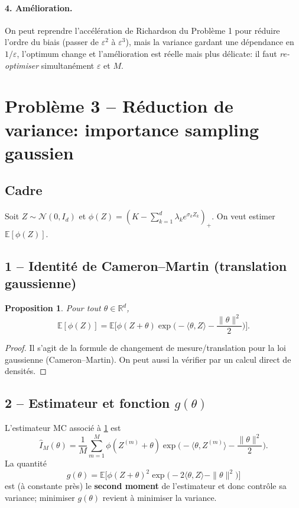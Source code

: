 \documentclass[11pt,a4paper]{article}
\newcommand{\E}{\mathbb{E}}
\newcommand{\R}{\mathbb{R}}
\newcommand{\1}{\mathbbm{1}}
\theoremstyle{plain}
\newtheorem{proposition}{Proposition}
\theoremstyle{definition}
\begin{document}
\paragraph{4. Amélioration.}
On peut reprendre l'accélération de Richardson du Problème 1 pour réduire l'ordre du biais (passer de $\varepsilon^2$ à $\varepsilon^3$), mais la variance gardant une dépendance en $1/\varepsilon$, l'optimum change et l'amélioration est réelle mais plus délicate: il faut \emph{re-optimiser} simultanément $\varepsilon$ et $M$.

\section{Problème 3 -- Réduction de variance: importance sampling gaussien}
\subsection{Cadre}
Soit $Z\sim\mathcal N(0,I_d)$ et $\phi(Z)=(K-\sum_{k=1}^d \lambda_k e^{\sigma_k Z_k})_+$.
On veut estimer $\E[\phi(Z)]$.

\subsection{1 -- Identité de Cameron--Martin (translation gaussienne)}
\begin{proposition}\label{prop:cameron-martin}
Pour tout $\theta\in\R^d$,
\[
\E[\phi(Z)]=\E\Big[\phi(Z+\theta)\exp\Big(-\langle\theta,Z\rangle-\frac{\|\theta\|^2}{2}\Big)\Big].
\]
\end{proposition}
\begin{proof}
Il s'agit de la formule de changement de mesure/translation pour la loi gaussienne (Cameron--Martin). On peut aussi la vérifier par un calcul direct de densités.
\end{proof}

\subsection{2 -- Estimateur et fonction $g(\theta)$}
L'estimateur MC associé à \ref{prop:cameron-martin} est
\[
\widehat I_M(\theta)=\frac1M\sum_{m=1}^M \phi(Z^{(m)}+\theta)\exp\Big(-\langle\theta,Z^{(m)}\rangle-\frac{\|\theta\|^2}{2}\Big).
\]
La quantité
\[
g(\theta)=\E\Big[\phi(Z+\theta)^2\exp\big(-2\langle\theta,Z\rangle-\|\theta\|^2\big)\Big]
\]
est (à constante près) le \textbf{second moment} de l'estimateur et donc contrôle sa variance; minimiser $g(\theta)$ revient à minimiser la variance.
\end{document}
